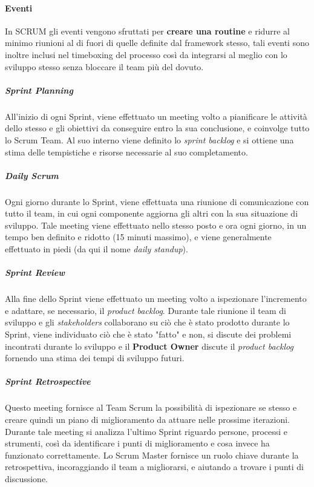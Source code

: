 \documentclass[../main.tex]{subfiles}
\begin{document}
        		\paragraph{Eventi}
        		In SCRUM gli eventi vengono sfruttati per \textbf{creare una routine} e ridurre al minimo riunioni al di fuori di quelle definite dal framework stesso, tali eventi sono inoltre inclusi nel timeboxing del processo così da integrarsi al meglio con lo sviluppo stesso senza bloccare il team più del dovuto.
        		
        			\subparagraph{Sprint Planning}
        			All'inizio di ogni Sprint, viene effettuato un meeting volto a pianificare le attività dello stesso e gli obiettivi da conseguire entro la sua conclusione, e coinvolge tutto lo Scrum Team. Al suo interno viene definito lo \emph{sprint backlog} e si ottiene una stima delle tempistiche e risorse necessarie al suo completamento.
        			
        			\subparagraph{Daily Scrum}
        			Ogni giorno durante lo Sprint, viene effettuata una riunione di comunicazione con tutto il team, in cui ogni componente aggiorna gli altri con la sua situazione di sviluppo. Tale meeting viene effettuato nello stesso posto e ora ogni giorno, in un tempo ben definito e ridotto (15 minuti massimo), e viene generalmente effettuato in piedi (da qui il nome \emph{daily standup}).
        			
        			\subparagraph{Sprint Review}
        			Alla fine dello Sprint viene effettuato un meeting volto a ispezionare l'incremento e adattare, se necessario, il \emph{product backlog}. Durante tale riunione il team di sviluppo e gli \emph{stakeholders} collaborano su
        			ciò che è stato prodotto durante lo Sprint, viene individuato ciò che è stato "fatto" e non, si discute dei problemi incontrati durante lo sviluppo e il \textbf{Product Owner} discute il \emph{product backlog} fornendo una stima dei tempi di sviluppo futuri.
        			
        			\subparagraph{Sprint Retrospective}
        			Questo meeting fornisce al Team Scrum la possibilità di ispezionare se stesso e creare quindi un piano di miglioramento da attuare nelle prossime iterazioni. Durante tale meeting si analizza l'ultimo Sprint riguardo persone, processi e strumenti, così da identificare i punti di miglioramento e cosa invece ha funzionato correttamente. Lo Scrum Master fornisce un ruolo chiave durante la retrospettiva, incoraggiando il team a migliorarsi, e aiutando a trovare i punti di discussione.
        					
\end{document}
